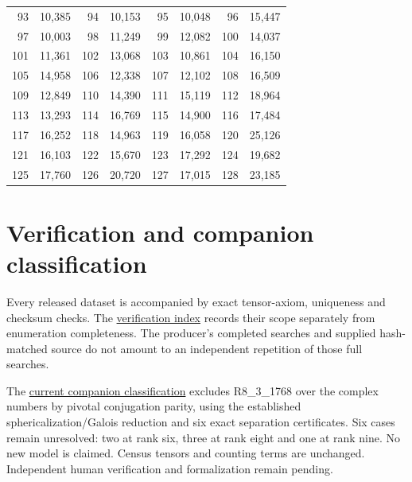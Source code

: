 \documentclass[11pt,a4paper]{article}
\theoremstyle{definition}\newtheorem{definition}[theorem]{Definition}\newtheorem{remark}[theorem]{Remark}
\begin{document}
\begin{longtable}{rr@{\hspace{1.1cm}}rr@{\hspace{1.1cm}}rr@{\hspace{1.1cm}}rr}
93 & 10,385 & 94 & 10,153 & 95 & 10,048 & 96 & 15,447\\
97 & 10,003 & 98 & 11,249 & 99 & 12,082 & 100 & 14,037\\
101 & 11,361 & 102 & 13,068 & 103 & 10,861 & 104 & 16,150\\
105 & 14,958 & 106 & 12,338 & 107 & 12,102 & 108 & 16,509\\
109 & 12,849 & 110 & 14,390 & 111 & 15,119 & 112 & 18,964\\
113 & 13,293 & 114 & 16,769 & 115 & 14,900 & 116 & 17,484\\
117 & 16,252 & 118 & 14,963 & 119 & 16,058 & 120 & 25,126\\
121 & 16,103 & 122 & 15,670 & 123 & 17,292 & 124 & 19,682\\
125 & 17,760 & 126 & 20,720 & 127 & 17,015 & 128 & 23,185\\
\bottomrule\end{longtable}
\section{Verification and companion classification}

Every released dataset is accompanied by exact tensor-axiom, uniqueness and
checksum checks. The \href{https://github.com/sebastienpalcoux/fusion-ring-census/blob/main/verification/README.md}{verification index}
records their scope separately from enumeration completeness. The producer's
completed searches and supplied hash-matched source do not amount to an
independent repetition of those full searches.

The \href{https://github.com/sebastienpalcoux/grothendieck-ring-classification/blob/main/evidence/frontier/README.md}{current companion classification}
excludes R8\_3\_1768 over the complex numbers by pivotal conjugation parity,
using the established sphericalization/Galois reduction and six exact
separation certificates. Six cases remain unresolved: two at rank six, three at rank eight and one at rank nine. No new model is claimed. Census
tensors and counting terms are unchanged. Independent human verification
and formalization remain pending.
\end{document}
